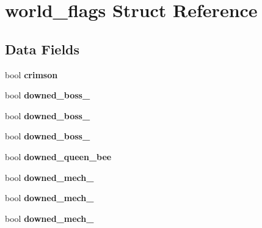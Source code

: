 \hypertarget{structworld__flags}{}\section{world\+\_\+flags Struct Reference}
\label{structworld__flags}
\subsection*{Data Fields}
\begin{DoxyCompactItemize}
\item 
\hypertarget{structworld__flags_ae37ac6a68dabf088fc4f47837273f19b}{}bool {\bfseries crimson}\label{structworld__flags_ae37ac6a68dabf088fc4f47837273f19b}

\item 
\hypertarget{structworld__flags_a5fa51f255b0ebf88d432d0dc6181d1fe}{}bool {\bfseries downed\+\_\+boss\+\_}\label{structworld__flags_a5fa51f255b0ebf88d432d0dc6181d1fe}

\item 
\hypertarget{structworld__flags_a7fa3d21abc15d250f058a7e34dbef755}{}bool {\bfseries downed\+\_\+boss\+\_}\label{structworld__flags_a7fa3d21abc15d250f058a7e34dbef755}

\item 
\hypertarget{structworld__flags_a2ccdf4e4e3f59ab04a007b0a111b412c}{}bool {\bfseries downed\+\_\+boss\+\_}\label{structworld__flags_a2ccdf4e4e3f59ab04a007b0a111b412c}

\item 
\hypertarget{structworld__flags_ac4b2d840792b3574463a87f9b1a1824f}{}bool {\bfseries downed\+\_\+queen\+\_\+bee}\label{structworld__flags_ac4b2d840792b3574463a87f9b1a1824f}

\item 
\hypertarget{structworld__flags_ab0bbe1be1bed4e04006ae49c636887d8}{}bool {\bfseries downed\+\_\+mech\+\_}\label{structworld__flags_ab0bbe1be1bed4e04006ae49c636887d8}

\item 
\hypertarget{structworld__flags_a147769f48163c0cbfbaf067cf2b6d20e}{}bool {\bfseries downed\+\_\+mech\+\_}\label{structworld__flags_a147769f48163c0cbfbaf067cf2b6d20e}

\item 
\hypertarget{structworld__flags_a957065e6d35e93a6d2c9f1d423dd4587}{}bool {\bfseries downed\+\_\+mech\+\_}\label{structworld__flags_a957065e6d35e93a6d2c9f1d423dd4587}


\end{DoxyCompactItemize}
